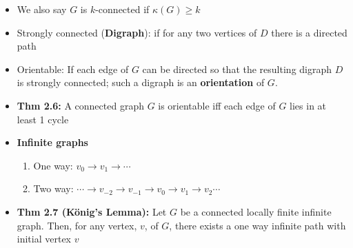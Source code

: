 \documentclass[10pt,landscape]{article}
\begin{document}
\begin{multicols}{2}
\begin{itemize}
    \item We also say $G$ is $k$-connected if $\kappa(G)\ge k$
    \item Strongly connected (\textbf{Digraph}): if for any two vertices of $D$ there is a directed path
    \item Orientable: If each edge of $G$ can be directed so that the resulting digraph $D$ is strongly connected; such a digraph is an \textbf{orientation} of $G$.
    \item \textbf{Thm 2.6:} A connected graph $G$ is orientable iff each edge of $G$ lies in at least 1 cycle
    \item \textbf{Infinite graphs} \begin{enumerate}
        \item One way: $v_0\to v_1\to \cdots$
        \item Two way: $\cdots\to v_{-2}\to v_{-1}\to v_0\to v_1\to v_2\cdots$
    \end{enumerate}
    \item \textbf{Thm 2.7 (König's Lemma):} Let $G$ be a connected locally finite infinite graph. Then, for any vertex, $v$, of $G$, there exists a one way infinite path with initial vertex $v$
\end{itemize}

\end{multicols}
\end{document}
